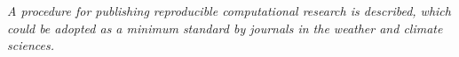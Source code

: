 \textit{A procedure for publishing reproducible computational research is described, which could be adopted as a minimum standard by journals in the weather and climate sciences.}
  